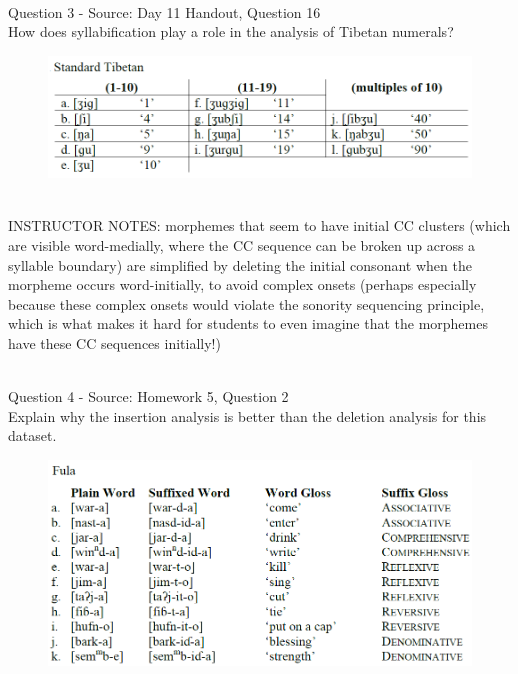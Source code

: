 \documentclass[12pt]{article}
\begin{document}
~\\

{\large Question 3} - Source: Day 11 Handout, Question 16\\

How does syllabification play a role in the analysis of Tibetan numerals?\\

\begin{figure}[H]
\includegraphics{../images/tibetan.png}
\end{figure}

~\\
INSTRUCTOR NOTES: morphemes that seem to have initial CC clusters (which are visible word-medially, where the CC sequence can be broken up across a syllable boundary) are simplified by deleting the initial consonant when the morpheme occurs word-initially, to avoid complex onsets (perhaps especially because these complex onsets would violate the sonority sequencing principle, which is what makes it hard for students to even imagine that the morphemes have these CC sequences initially!)


~\\

{\large Question 4} - Source: Homework 5, Question 2\\

Explain why the insertion analysis is better than the deletion analysis for this dataset.\\

\begin{figure}[H]
\includegraphics{../images/fula.png}
\end{figure}
\end{document}
